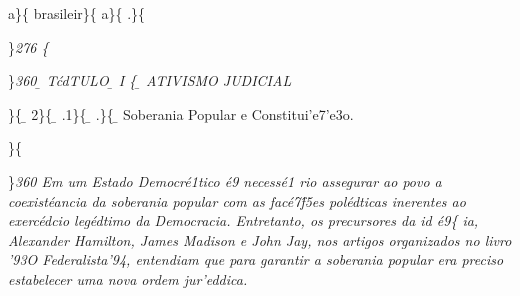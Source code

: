a\}\{\rtlch{}  \ltrch{}
brasileir\}\{\rtlch{}  \ltrch{}
a\}\{\rtlch{}  \ltrch{}
.\}\{\rtlch{}  \ltrch{} 
\par \}\pard \ltrpar\ql {}\sl276\widctlpar\wrapdefault\aspalpha\aspnum\faauto\adjustright{} \{\rtlch{}
 \ltrch{}  \page 
\par \}\pard \ltrpar\qj {}\sl360\widctlpar\wrapdefault\aspalpha\aspnum\faauto\adjustright{} {\rtlch{} \ab{} \ltrch{} \b{} T\'cdTULO}{\rtlch{} \ab{} 
\ltrch{} \b{}  I }\{\rtlch{} \ab{}
\ltrch{} \b{} ATIVISMO JUDICIAL
\par \}\{\rtlch{} \ab{} \ltrch{}
\b{} 2\}\{\rtlch{} \ab{}
\ltrch{} \b{} .1\}\{\rtlch{}
\ab{} \ltrch{} \b{} .\}\{\rtlch{}
\ab{} \ltrch{} \b{}
Soberania Popular e Constitui'e7'e3o. \par \}\{\rtlch{} 
\ltrch{} 
\par \}\pard \ltrpar\qj {}\sl360\widctlpar\wrapdefault\aspalpha\aspnum\faauto\adjustright{} {\rtlch{}  \ltrch{}  Em um Estado Democr\'e1tico \'e9 necess\'e1
rio assegurar ao povo a coexist\'eancia da soberania popular com as fac\'e7\'f5es pol\'edticas inerentes ao exerc\'edcio leg\'edtimo da Democracia. Entretanto, os precursores da id}{\rtlch{}  \ltrch{}  \'e9}\{\rtlch{}
 \ltrch{}  ia, Alexander
Hamilton, James Madison e John Jay, nos artigos organizados no livro
'93O Federalista'94, entendiam que para garantir a soberania popular era
preciso estabelecer uma nova ordem jur'eddica.

\par 

